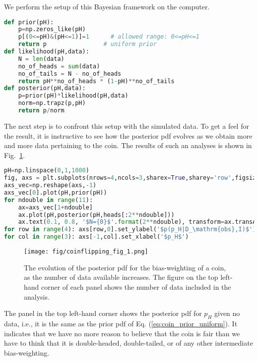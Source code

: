 \documentclass[%
oneside,                 %
final,                   %
10pt]{article}
\begin{document}
We perform the setup of this Bayesian framework on the computer.

\begin{lstlisting}[language=Python,style=blue1]
def prior(pH):
    p=np.zeros_like(pH)
    p[(0<=pH)&(pH<=1)]=1      # allowed range: 0<=pH<=1
    return p                # uniform prior
def likelihood(pH,data):
    N = len(data)
    no_of_heads = sum(data)
    no_of_tails = N - no_of_heads
    return pH**no_of_heads * (1-pH)**no_of_tails
def posterior(pH,data):
    p=prior(pH)*likelihood(pH,data)
    norm=np.trapz(p,pH)
    return p/norm
\end{lstlisting}

The next step is to confront this setup with the simulated data. To get a feel for the result, it is instructive to see how the posterior pdf evolves as we obtain more and more data pertaining to the coin. The results of such an analyses is shown in Fig.~\ref{fig:coinflipping}. 

\begin{lstlisting}[language=Python,style=blue1]
pH=np.linspace(0,1,1000)
fig, axs = plt.subplots(nrows=4,ncols=3,sharex=True,sharey='row',figsize=(14,14))
axs_vec=np.reshape(axs,-1)
axs_vec[0].plot(pH,prior(pH))
for ndouble in range(11):
    ax=axs_vec[1+ndouble]
    ax.plot(pH,posterior(pH,heads[:2**ndouble]))
    ax.text(0.1, 0.8, '$N={0}$'.format(2**ndouble), transform=ax.transAxes)
for row in range(4): axs[row,0].set_ylabel('$p(p_H|D_\mathrm{obs},I)$')
for col in range(3): axs[-1,col].set_xlabel('$p_H$')
\end{lstlisting}


\begin{figure}[!ht]  %
  \centerline{\texttt{[image: fig/coinflipping\_fig\_1.png]}}
  \caption{
  The evolution of the posterior pdf for the bias-weighting of a coin, as the number of data available increases. The figure on the top left-hand corner of each panel shows the number of data included in the analysis. \label{fig:coinflipping}
  }
\end{figure}


The panel in the top left-hand corner shows the posterior pdf for $p_H$ given no data, i.e., it is the same as the prior pdf of Eq. (\ref{eq:coin_prior_uniform}). It indicates that we have no more reason to believe that the coin is fair than we have to think that it is double-headed, double-tailed, or of any other intermediate bias-weighting.
\end{document}
